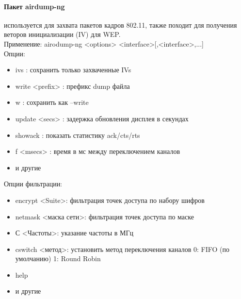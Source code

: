 \documentclass[10pt,a4paper]{report}
\begin{document}
\paragraph{Пакет airdump-ng} используется для захвата пакетов кадров 802.11, также походит для получения веторов инициализации (IV) для WEP. \\
Применение: airodump-ng <options> <interface>[,<interface>,...] \\
Опции:
\begin{itemize} 
\item ivs : сохранить только захваченные IVs
\item write <prefix> : префикс dump файла
\item w : сохранить как --write
\item update <secs> : задержка обновления дисплея в секундах
\item showack  : показать статистику ack/cts/rts
\item f <msecs> : время в мс между переключением каналов 
\item и другие
\end{itemize} 
Опции фильтрации:
\begin{itemize} 
\item encrypt <Suite>: фильтрация точек доступа по набору шифров
\item netmask <маска сети>: фильтрация точек доступа по маске
\item С <Частоты>: указание частоты в МГц 
\item cswitch <метод>: установить метод переключения каналов
                   0: FIFO (по умолчанию)
                   1: Round Robin
\item  help
\item и другие
\end{itemize} 
\end{document}
